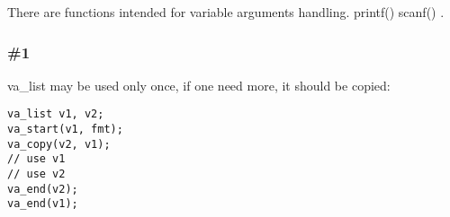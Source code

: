 {There are functions intended for variable arguments handling}.
 printf() \AndENRU scanf() 
.

\subsubsection{ \#1}

 va\_list 
{may be used only once, if one need more, it should be copied}:

\begin{lstlisting}
va_list v1, v2;
va_start(v1, fmt);
va_copy(v2, v1);
// use v1
// use v2
va_end(v2);
va_end(v1);
\end{lstlisting}

